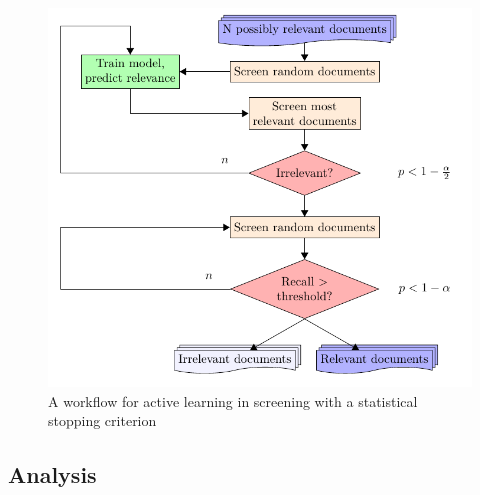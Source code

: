 \documentclass{bmcart}
\begin{document}
	\medskip
	
	\begin{figure}
		\includegraphics[width=0.5\linewidth]{../images/flow}
		\caption{A workflow for active learning in screening with a statistical stopping criterion}
		\label{flow}
	\end{figure}

	\subsection*{Analysis}
%	
\end{document}
